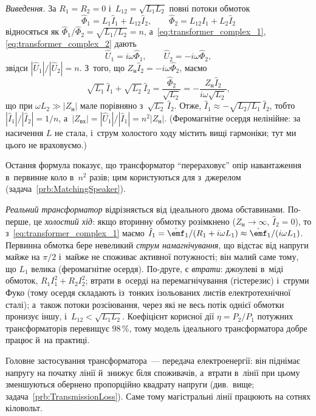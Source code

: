 \emph{Виведення.} За $R_1=R_2=0$ і~$L_{12}=\sqrt{L_1L_2}$ повні потоки обмоток
\begin{equation*}
	\hat\Phi_1=L_1\hat I_1+L_{12}\hat I_2, \qquad \hat\Phi_2=L_{12}\hat I_1+L_2\hat I_2
\end{equation*}
відносяться як $\hat\Phi_1/\hat\Phi_2=\sqrt{L_1/L_2}=n$, а~\eqref{eq:transformer_complex_1}, \eqref{eq:transformer_complex_2} дають
\begin{equation*}
	\hat U_1=i\omega\hat\Phi_1, \qquad \hat U_2=-i\omega\hat\Phi_2,
\end{equation*}
звідси $|\hat U_1|/|\hat U_2|=n$. З~того, що $Z_\text{н}\hat I_2=-i\omega\hat\Phi_2$, маємо
\begin{equation*}
	\sqrt{L_1}\,\hat I_1+\sqrt{L_2}\,\hat I_2=\frac{\hat\Phi_2}{\sqrt{L_2}}=-\frac{Z_\text{н}\hat I_2}{i\omega\sqrt{L_2}},
\end{equation*}
що при $\omega L_2\gg|Z_\text{н}|$ мале порівняно з~$\sqrt{L_2}\,\hat I_2$. Отже, $\hat I_1\approx-\sqrt{L_2/L_1}\,\hat I_2$, тобто $|\hat I_1|/|\hat I_2|=1/n$, а~$|Z_\text{вх}|=|\hat U_1|/|\hat I_1|=n^2|Z_\text{н}|$. (Феромагнітне осердя нелінійне: за насичення $L$ не стала, і~струм холостого ходу містить вищі гармоніки; тут ми цього не враховуємо.)

Остання формула показує, що трансформатор \enquote{перераховує}
опір навантаження в~первинне коло в~$n^2$ разів; цим користуються для  з~джерелом
(задача~\ref{prb:MatchingSpeaker}).

\emph{Реальний трансформатор} відрізняється від ідеального двома обставинами. По-перше, це \emph{холостий хід}: якщо вторинну обмотку розімкнено ($Z_\text{н}\to\infty$, $\hat I_2=0$), то з~\eqref{eq:transformer_complex_1} маємо $\hat I_1=\hat{\emf}_1/(R_1+i\omega L_1)\approx\hat{\emf}_1/(i\omega L_1)$. Первинна обмотка бере невеликий \emph{струм намагнічування}, що відстає від напруги майже на $\pi/2$ і~майже не споживає активної потужності; він малий саме тому, що $L_1$ велика (феромагнітне осердя). По-друге, є \emph{втрати}: джоулеві в~міді обмоток, $R_1I_1^2+R_2I_2^2$; втрати в~осерді на перемагнічування (гістерезис) і~струми Фуко (тому осердя складають із~тонких ізольованих листів електротехнічної сталі); а~також потоки розсіювання, через які не весь потік однієї обмотки пронизує іншу, і~$L_{12}<\sqrt{L_1L_2}$. Коефіцієнт корисної дії $\eta=P_2/P_1$ потужних трансформаторів перевищує $98\,\%$, тому модель ідеального трансформатора добре працює й~на практиці.

Головне застосування трансформатора~--- передача електроенергії: він піднімає напругу на початку лінії й~знижує біля споживачів, а~втрати в~лінії при цьому зменшуються обернено пропорційно квадрату напруги (див.\ вище; задача~\ref{prb:TransmissionLoss}). Саме тому магістральні лінії працюють на сотнях кіловольт.


